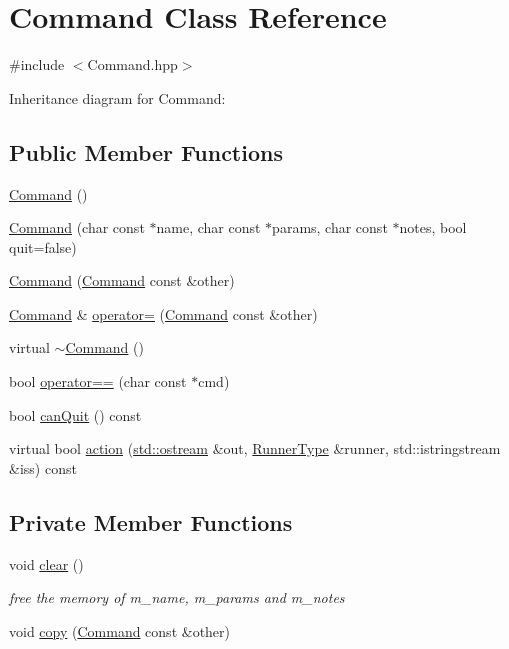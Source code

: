 \hypertarget{classCommand}{}\section{Command Class Reference}
\label{classCommand}


{\ttfamily \#include $<$Command.\+hpp$>$}



Inheritance diagram for Command\+:
\subsection*{Public Member Functions}
\begin{DoxyCompactItemize}
\item 
\hyperlink{classCommand_a18df2d81039392daeb0b78c346a70537}{Command} ()
\item 
\hyperlink{classCommand_ac26b14828c5a72f9bd370421a4788b5d}{Command} (char const $\ast$name, char const $\ast$params, char const $\ast$notes, bool quit=false)
\item 
\hyperlink{classCommand_a8ccab91a784c447f628ee8fec3873494}{Command} (\hyperlink{classCommand}{Command} const \&other)
\item 
\hyperlink{classCommand}{Command} \& \hyperlink{classCommand_a378451c967b9d585492a778bab58f803}{operator=} (\hyperlink{classCommand}{Command} const \&other)
\item 
virtual \hyperlink{classCommand_ab552bb3a07fdd1acbfd8ea76e69b2278}{$\sim$\+Command} ()
\item 
bool \hyperlink{classCommand_a75d6d67687c9d29e47ce9e80540bbd1e}{operator==} (char const $\ast$cmd)
\item 
bool \hyperlink{classCommand_a0ec10c9753786caf083aba08cf85afb0}{can\+Quit} () const
\item 
virtual bool \hyperlink{classCommand_ac423f5674fc858c0cc42f494943bc0d0}{action} (\hyperlink{doctest_8h_a116af65cb5e924b33ad9d9ecd7a783f3}{std\+::ostream} \&out, \hyperlink{Command_8hpp_ad45c3de597c2023a8be0399d914161f4}{Runner\+Type} \&runner, std\+::istringstream \&iss) const
\end{DoxyCompactItemize}
\subsection*{Private Member Functions}
\begin{DoxyCompactItemize}
\item 
void \hyperlink{classCommand_a57fbea0c0d10ef4b184c7ef3eb34590d}{clear} ()
\begin{DoxyCompactList}\small\item\em free the memory of m\+\_\+name, m\+\_\+params and m\+\_\+notes \end{DoxyCompactList}\item 
void \hyperlink{classCommand_afc097ed76cb9fd7135146ec8703e2c3e}{copy} (\hyperlink{classCommand}{Command} const \&other)
\end{DoxyCompactItemize}
